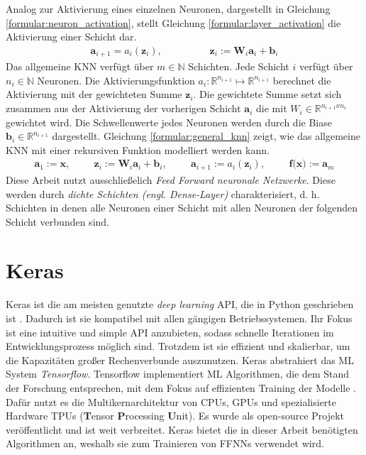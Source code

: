 Analog zur Aktivierung eines einzelnen Neuronen, dargestellt in Gleichung \ref{formular:neuron_activation}, stellt Gleichung \ref{formular:layer_activation} die Aktivierung einer Schicht dar.
\begin{align}
    \label{formular:layer_activation}
    \textbf{a}_{i+1} = a_i(\textbf{z}_i), \hspace{2cm} \textbf{z}_i := \textbf{W}_i\textbf{a}_i + \textbf{b}_i
\end{align}
Das allgemeine KNN verfügt über $m\in\mathbb{N}$ Schichten. Jede Schicht $i$ verfügt über $n_i\in\mathbb{N}$ Neuronen.
Die Aktivierungsfunktion $a_i:\mathbb{R}^{n_{i+1}}\mapsto\mathbb{R}^{n_{i+1}}$ berechnet die Aktivierung mit der gewichteten Summe $\textbf{z}_i$.
Die gewichtete Summe setzt sich zusammen aus der Aktivierung der vorherigen Schicht $\textbf{a}_i$ die mit $W_i\in\mathbb{R}^{n_{i+1}x{n_{i}}}$ gewichtet wird.
Die Schwellenwerte jedes Neuronen werden durch die Biase $\textbf{b}_i\in\mathbb{R}^{n_{i+1}}$ dargestellt.
Gleichung \ref{formular:general_knn} zeigt, wie das allgemeine KNN mit einer rekursiven Funktion modelliert werden kann.
\begin{align}
    \label{formular:general_knn}
    \textbf{a}_1 := \textbf{x}, \hspace{1cm} \textbf{z}_i := \textbf{W}_i\textbf{a}_i + \textbf{b}_i, \hspace{1cm} \textbf{a}_{i+1} := a_i(\textbf{z}_i), \hspace{1cm} \textbf{f(x)} := \textbf{a}_m
\end{align}
Diese Arbeit nutzt ausschließelich \textit{Feed Forward neuronale Netzwerke}.
Diese werden durch \textit{dichte Schichten (engl. Dense-Layer)} charakterisiert, d. h. Schichten in denen alle Neuronen einer Schicht mit allen Neuronen der folgenden Schicht verbunden sind.

\section{Keras}
Keras ist die am meisten genutzte \textit{deep learning} API, die in Python geschrieben ist \cite{kerasDoc}.
Dadurch ist sie kompatibel mit allen gängigen Betriebssystemen.
Ihr Fokus ist eine intuitive und simple API anzubieten, sodass schnelle Iterationen im Entwicklungsprozess möglich sind.
Trotzdem ist sie effizient und skalierbar, um die Kapazitäten großer Rechenverbunde auszunutzen.
\newline
\newline
Keras abstrahiert das ML System \textit{Tensorflow}. Tensorflow implementiert ML Algorithmen, die dem Stand der Forschung entsprechen, mit dem Fokus
auf effizienten Training der Modelle \cite{abadi2016tensorflow}.
Dafür nutzt es die Multikernarchitektur von CPUs, GPUs und spezialisierte Hardware TPUs (\textbf{T}ensor \textbf{P}rocessing \textbf{U}nit).
Es wurde als open-source Projekt veröffentlicht und ist weit verbreitet.
\newline
\newline
Keras bietet die in dieser Arbeit benötigten Algorithmen an, weshalb sie zum Trainieren von FFNNs verwendet wird.

